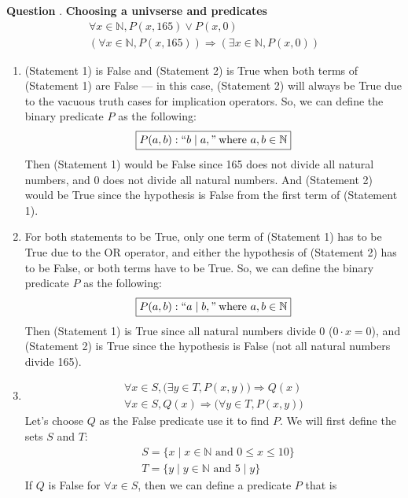 \documentclass{article}
\newcounter{qcount}
\newcommand\q{\stepcounter{qcount} \textbf{Question \theqcount}. }
\begin{document}
\newpage
\q \textbf{Choosing a univserse and predicates}
\begin{align*}
    \forall x \in \mathbb{N}, P(x, 165) \lor P(x, 0) \tag*{(Statement 1)} \\
    (\forall x \in \mathbb{N}, P (x, 165)) \Rightarrow (\exists x \in \mathbb{N}, 
    P(x, 0 )) \tag*{(Statement 2)}
\end{align*}
\begin{enumerate}[label=(\alph*)]
    \item (Statement 1) is False and (Statement 2) is True when both 
terms of (Statement 1) are False --- in this case, (Statement 2) will always be 
True due to the vacuous truth cases for implication operators. So, we can define
the binary predicate $P$ as the following:
$$\boxed{P(a, b) : ``b \mid a," \: \text{where } a, b \in \mathbb{N}} $$
Then (Statement 1) would be False since 165 does not divide all natural 
numbers, and 0 does not divide all natural numbers. And (Statement 2) 
would be True since the hypothesis is False from the first term of (Statement 1).
    \item For both statements to be True, only one term of (Statement 1) has 
        to be True due to the OR operator, and either the hypothesis of 
        (Statement 2) has to be False, or both terms have to be True. So, we 
        can define the binary predicate $P$ as the following:
        $$\boxed{P(a, b) : ``a \mid b," \: \text{where } a, b \in \mathbb{N}}$$
        Then (Statement 1) is True since all natural numbers divide 0 ($0 \cdot x = 0$), 
        and (Statement 2) is True since the hypothesis is False (not all natural numbers 
        divide 165).
    \item \begin{align*}
        \forall x \in S, \Big( \exists y \in T, P(x, y) \Big) \Rightarrow Q(x) \tag*{(Statement 3)}\\
        \forall x \in S, Q(x) \Rightarrow \Big( \forall y \in T, P(x,y) \Big) \tag*{(Statement 4)}
    \end{align*}
    Let's choose $Q$ as the False predicate use it to find $P$. 
    We will first define the sets $S$ and $T$:
    \begin{align*}
        &\boxed{S = \{ x \mid x \in \mathbb{N} \text{ and } 0 \leq x \leq 10 \}} \\
        &\boxed{T = \{ y \mid y \in \mathbb{N} \text{ and } 5 \mid y \}}
    \end{align*}
    If $Q$ is False for $\forall x \in S$, then we can define a predicate $P$ that is 

\end{enumerate}
\end{document}
